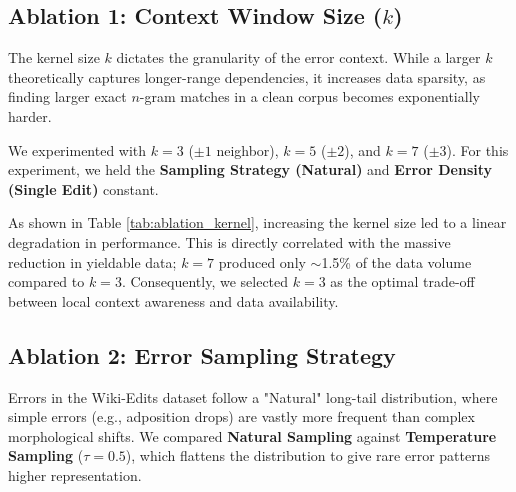 \documentclass[11pt]{article}
\begin{document}
\subsection{Ablation 1: Context Window Size ($k$)}
The kernel size $k$ dictates the granularity of the error context. While a larger $k$ theoretically captures longer-range dependencies, it increases data sparsity, as finding larger exact $n$-gram matches in a clean corpus becomes exponentially harder. 

We experimented with $k=3$ ($\pm 1$ neighbor), $k=5$ ($\pm 2$), and $k=7$ ($\pm 3$). For this experiment, we held the \textbf{Sampling Strategy (Natural)} and \textbf{Error Density (Single Edit)} constant.

\begin{table}[h]
\centering
\small
{}
\caption{Impact of Kernel Size on GEC performance. Dataset size represents the number of sentences where a matching context was found in the clean corpus.}
\label{tab:ablation_kernel}
\end{table}

As shown in Table \ref{tab:ablation_kernel}, increasing the kernel size led to a linear degradation in performance. This is directly correlated with the massive reduction in yieldable data; $k=7$ produced only $\sim$1.5\% of the data volume compared to $k=3$. Consequently, we selected $k=3$ as the optimal trade-off between local context awareness and data availability.

\subsection{Ablation 2: Error Sampling Strategy}
Errors in the Wiki-Edits dataset follow a "Natural" long-tail distribution, where simple errors (e.g., adposition drops) are vastly more frequent than complex morphological shifts. We compared \textbf{Natural Sampling} against \textbf{Temperature Sampling} ($\tau=0.5$), which flattens the distribution to give rare error patterns higher representation. 
\end{document}
